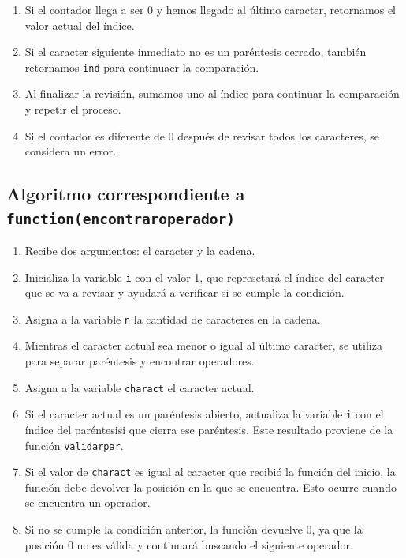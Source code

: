 \documentclass{article}
\begin{document}
\begin{enumerate}
    \item Si el contador llega a ser 0 y hemos llegado al último caracter, retornamos el valor actual del índice. 

    \item Si el caracter siguiente inmediato no es un paréntesis cerrado, también retornamos \texttt{ind} para continuacr la comparación. 

    \item Al finalizar la revisión, sumamos uno al índice para continuar la comparación y repetir el proceso. 

    \item Si el contador es diferente de 0 después de revisar todos los caracteres, se considera un error.\\
\end{enumerate}

\subsection{Algoritmo correspondiente a \texttt{function(encontrar\textunderscore operador)}}
\begin{enumerate}
    \item Recibe dos argumentos: el caracter y la cadena. 

    \item Inicializa la variable \texttt{i} con el valor 1, que represetará el índice del caracter que se va a revisar y ayudará a verificar si se cumple la condición. 

    \item Asigna a la variable \texttt{n} la cantidad de caracteres en la cadena. 

    \item Mientras el caracter actual sea menor o igual al último caracter, se utiliza para separar paréntesis y encontrar operadores.

    \item Asigna a la variable \texttt{char\textunderscore act} el caracter actual.

    \item Si el caracter actual es un paréntesis abierto, actualiza la variable \texttt{i} con el índice del paréntesisi que cierra ese paréntesis. Este resultado proviene de la función \texttt{validar\textunderscore par}.

    \item Si el valor de \texttt{char\textunderscore act} es igual al caracter que recibió la función del inicio, la función debe devolver la posición en la que se encuentra. Esto ocurre cuando se encuentra un operador. 

    \item Si no se cumple la condición anterior, la función devuelve 0, ya que la posición 0 no es válida y continuará buscando el siguiente operador.\\
\end{enumerate}
\end{document}
